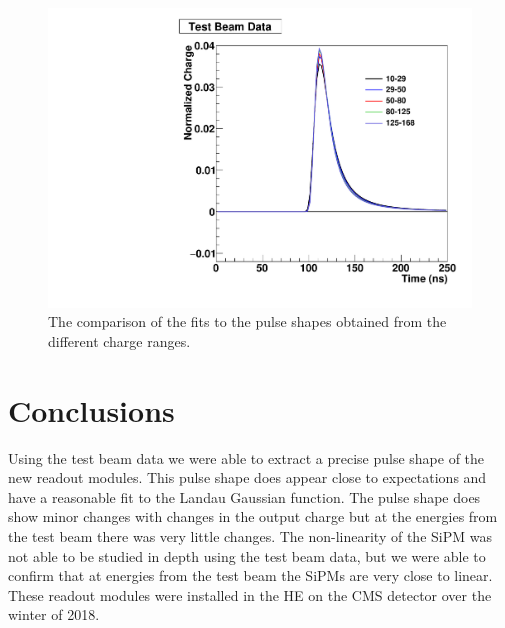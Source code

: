 \begin{figure}
\centering
\includegraphics[width=0.8\linewidth]{Figures/Overlap.pdf}
\caption{The comparison of the fits to the pulse shapes obtained from the different charge ranges.}
\label{fig:Overlap}
\end{figure}


\section{Conclusions}

Using the test beam data we were able to extract a precise pulse shape of the new readout modules. This pulse shape does appear close to expectations and have a reasonable fit to the Landau Gaussian function. The pulse shape does show minor changes with changes in the output charge but at the energies from the test beam there was very little changes. The non-linearity of the SiPM was not able to be studied in depth using the test beam data, but we were able to confirm that at energies from the test beam the SiPMs are very close to linear. These readout modules were installed in the HE on the CMS detector over the winter of 2018. 

